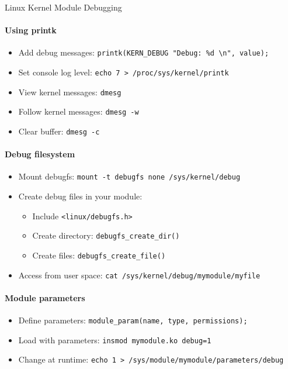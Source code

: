 \begin{KR}{Linux Kernel Module Debugging}
    \paragraph{Using printk}
    \begin{itemize}
        \item Add debug messages: \texttt{printk(KERN\_DEBUG "Debug: \%d \textbackslash n", value);}
        \item Set console log level: \texttt{echo 7 > /proc/sys/kernel/printk}
        \item View kernel messages: \texttt{dmesg}
        \item Follow kernel messages: \texttt{dmesg -w}
        \item Clear buffer: \texttt{dmesg -c}
    \end{itemize}
    
    \paragraph{Debug filesystem}
    \begin{itemize}
        \item Mount debugfs: \texttt{mount -t debugfs none /sys/kernel/debug}
        \item Create debug files in your module:
            \begin{itemize}
                \item Include \texttt{<linux/debugfs.h>}
                \item Create directory: \texttt{debugfs\_create\_dir()}
                \item Create files: \texttt{debugfs\_create\_file()}
            \end{itemize}
        \item Access from user space: \texttt{cat /sys/kernel/debug/mymodule/myfile}
    \end{itemize}
    
    \paragraph{Module parameters}
    \begin{itemize}
        \item Define parameters: \texttt{module\_param(name, type, permissions);}
        \item Load with parameters: \texttt{insmod mymodule.ko debug=1}
        \item Change at runtime: \texttt{echo 1 > /sys/module/mymodule/parameters/debug}
    \end{itemize}
    

\end{KR}
